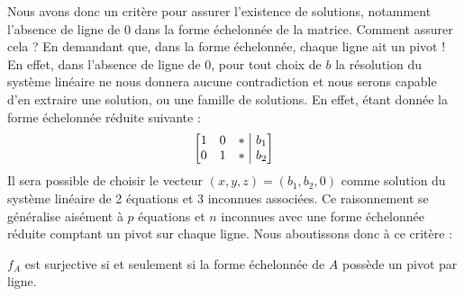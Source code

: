\noindent Nous avons donc un critère pour assurer l'existence de solutions, notamment l'absence de ligne de $0$ dans la forme échelonnée de la matrice. Comment assurer cela ? En demandant que, dans la forme échelonnée, chaque ligne ait un pivot ! En effet, dans l'absence de ligne de $0$, pour tout choix de $b$ la résolution du système linéaire ne nous donnera aucune contradiction et nous serons capable d'en extraire une solution, ou une famille de solutions. En effet, étant donnée la forme échelonnée réduite suivante :
$$\begin{bmatrix}
1 & 0 & * \bigm| b_1 \\
0 & 1 & * \bigm| b_2
\end{bmatrix}
$$ 
Il sera possible de choisir le vecteur $(x,y,z) = (b_1, b_2, 0)$ comme solution du système linéaire de 2 équations et 3 inconnues associées. Ce raisonnement se généralise aisément à $p$ équations et $n$ inconnues avec une forme échelonnée réduite comptant un pivot sur chaque ligne. Nous aboutissons donc à ce critère :
\begin{boxprop}
$f_A$ est surjective si et seulement si la forme échelonnée de $A$ possède un pivot par ligne.
\end{boxprop}

